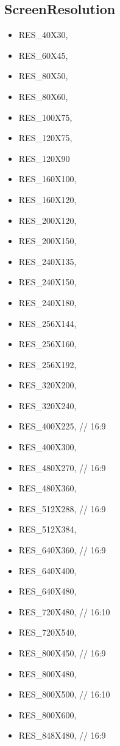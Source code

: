 \subsection{ScreenResolution}
\begin{itemize}
\item RES\_40X30,
 \item      RES\_60X45,
 \item       RES\_80X50,
 \item       RES\_80X60,
 \item       RES\_100X75,
 \item       RES\_120X75,
 \item       RES\_120X90
 \item       RES\_160X100,
 \item      RES\_160X120,
      \item  RES\_200X120,
      \item  RES\_200X150,
      \item  RES\_240X135,
      \item  RES\_240X150,
      \item  RES\_240X180,
      \item  RES\_256X144,
      \item  RES\_256X160,
      \item  RES\_256X192,
      \item  RES\_320X200,
      \item  RES\_320X240,
      \item  RES\_400X225,	// 16:9
      \item  RES\_400X300,
  \item      RES\_480X270,	// 16:9
 \item       RES\_480X360,
 \item       RES\_512X288,	// 16:9
 \item       RES\_512X384,
 \item       RES\_640X360,	// 16:9
 \item       RES\_640X400,
 \item       RES\_640X480,
 \item       RES\_720X480,	// 16:10
 \item       RES\_720X540,
 \item       RES\_800X450,	// 16:9
 \item       RES\_800X480,
 \item       RES\_800X500,	// 16:10
  \item      RES\_800X600,
 \item       RES\_848X480,	// 16:9

\end{itemize}
